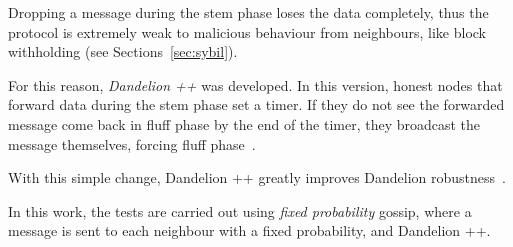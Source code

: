 Dropping a message during the stem phase loses the data completely, thus the protocol is extremely weak to malicious behaviour from neighbours, like block withholding (see Sections~\ref{sec:sybil}).

For this reason, \textit{Dandelion ++} was developed. In this version, honest nodes that forward data during the stem phase set a timer. If they do not see the forwarded message come back in fluff phase by the end of the timer, they broadcast the message themselves, forcing fluff phase~\cite{dandplus}.

With this simple change, Dandelion ++ greatly improves Dandelion robustness~\cite{lunes-dissemination}.\par

In this work, the tests are carried out using \textit{fixed probability} gossip, where a message is sent to each neighbour with a fixed probability, and Dandelion ++.